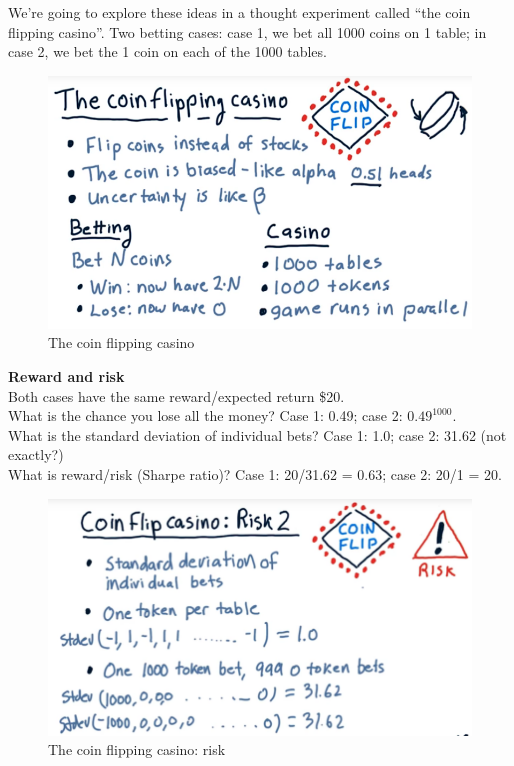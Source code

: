 \documentclass[12pt]{article}
\newcommand{\q}[1]{``#1''}
\begin{document}
We're going to explore these ideas in a thought experiment called \q{the coin flipping casino}. Two betting cases: case 1, we bet all 1000 coins on 1 table; in case 2, we bet the 1 coin on each of the 1000 tables.

\begin{figure}[!ht]
\centering
\includegraphics[scale=0.4]{fig/fig60}
\caption{The coin flipping casino}
\end{figure}

\noindent
\textbf{Reward and risk} \\
Both cases have the same reward/expected return \$20. \\
What is the chance you lose all the money? Case 1: 0.49; case 2: $0.49^1000$. \\
What is the standard deviation of individual bets? Case 1: 1.0; case 2: 31.62 (not exactly?) \\
What is reward/risk (Sharpe ratio)? Case 1: 20/31.62 = 0.63; case 2: 20/1 = 20. 

\begin{figure}[!ht]
\centering
\includegraphics[scale=0.4]{fig/fig61}
\caption{The coin flipping casino: risk}
\end{figure}
\end{document}
